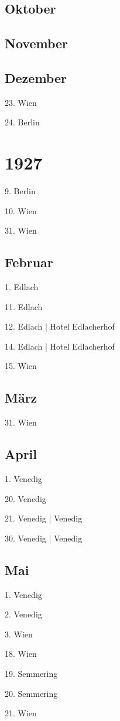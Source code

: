 \documentclass[twoside=false,titlepage=false,open=any, parskip=never, fontsize=10pt, headings=small, chapterprefix=false, appendixprefix=false, DIV=15]{scrbook}
\begin{document}
\begin{multicols}{3}
            \section*{Oktober}
            \section*{November}
            \section*{Dezember}
            23. Wien\par
            24. Berlin\par
            \chapter*{1927}
            9. Berlin\par
            10. Wien\par
            31. Wien\par
            \section*{Februar}
            1. Edlach\par
            11. Edlach\par
            12. Edlach | Hotel Edlacherhof\par
            14. Edlach | Hotel Edlacherhof\par
            15. Wien\par
            \section*{März}
            31. Wien\par
            \section*{April}
            1. Venedig\par
            20. Venedig\par
            21. Venedig | Venedig\par
            30. Venedig | Venedig\par
            \section*{Mai}
            1. Venedig\par
            2. Venedig\par
            3. Wien\par
            18. Wien\par
            19. Semmering\par
            20. Semmering\par
            21. Wien\par

\end{multicols}
\end{document}
